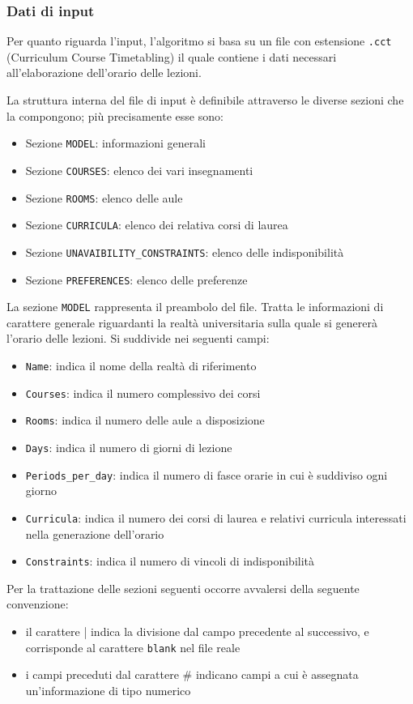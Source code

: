 \documentclass[11pt,a4paper]{article}
\begin{document}
\subsubsection*{Dati di input}\label{Algo_Input}
Per quanto riguarda l'input, l'algoritmo si basa su un file con estensione \verb|.cct| (Curriculum Course Timetabling) il quale contiene i dati necessari all'elaborazione dell'orario delle lezioni.

La struttura interna del file di input è definibile attraverso le diverse sezioni che la compongono; più precisamente esse sono:
\begin{itemize}
\item	Sezione \verb|MODEL|: informazioni generali
\item	Sezione \verb|COURSES|: elenco dei vari insegnamenti
\item	Sezione \verb|ROOMS|: elenco delle aule
\item	Sezione \verb|CURRICULA|: elenco dei relativa corsi di laurea
\item	Sezione \verb|UNAVAIBILITY_CONSTRAINTS|: elenco delle indisponibilità
\item	Sezione \verb|PREFERENCES|: elenco delle preferenze
\end{itemize}
La sezione \verb|MODEL| rappresenta il preambolo del file. Tratta le informazioni di carattere generale riguardanti la realtà universitaria sulla quale si genererà l'orario delle lezioni. Si suddivide nei seguenti campi:
\begin{itemize}
\item	\verb|Name|: indica il nome della realtà di riferimento
\item	\verb|Courses|: indica il numero complessivo dei corsi 
\item	\verb|Rooms|: indica il numero delle aule a disposizione
\item	\verb|Days|: indica il numero di giorni di lezione
\item	\verb|Periods_per_day|: indica il numero di fasce orarie in cui è suddiviso ogni giorno
\item	\verb|Curricula|: indica il numero dei corsi di laurea e relativi curricula interessati nella generazione dell'orario
\item	\verb|Constraints|: indica il numero di vincoli di indisponibilità
\end{itemize}

Per la trattazione delle sezioni seguenti occorre avvalersi della seguente convenzione:
\begin{itemize}
\item il carattere | indica la divisione dal campo precedente al successivo, e corrisponde al carattere \verb|blank| nel file reale
\item i campi preceduti dal carattere \# indicano campi a cui è assegnata un'informazione di tipo numerico
\end{itemize}
\end{document}
